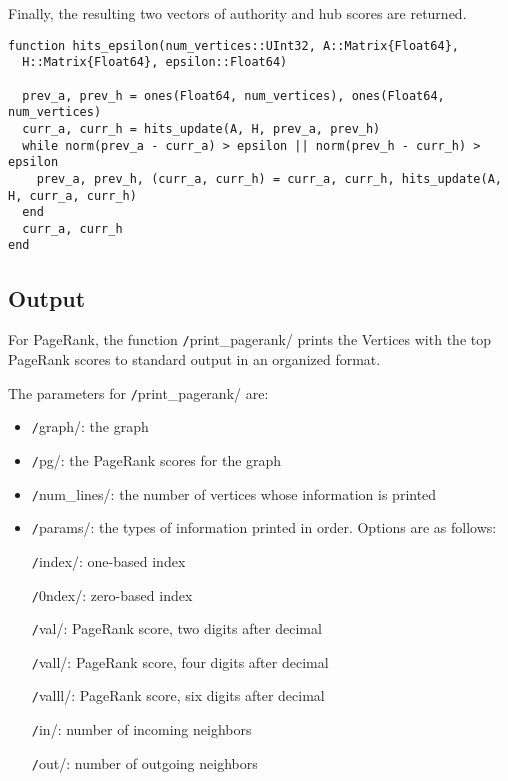 \documentclass[12pt, titlepage, twoside]{amsart}
\begin{document}
Finally, the resulting two vectors of authority and hub scores are returned.

\begin{verbatim}
function hits_epsilon(num_vertices::UInt32, A::Matrix{Float64},
  H::Matrix{Float64}, epsilon::Float64)

  prev_a, prev_h = ones(Float64, num_vertices), ones(Float64, num_vertices)
  curr_a, curr_h = hits_update(A, H, prev_a, prev_h)
  while norm(prev_a - curr_a) > epsilon || norm(prev_h - curr_h) > epsilon
    prev_a, prev_h, (curr_a, curr_h) = curr_a, curr_h, hits_update(A, H, curr_a, curr_h)
  end
  curr_a, curr_h
end
\end{verbatim}

\subsection{Output}

For PageRank, the function \texttt/print_pagerank/ prints
the Vertices with the top PageRank scores to standard output in an organized format.

The parameters for \texttt/print_pagerank/ are:

\begin{itemize}[label={}]
\item \texttt/graph/: the graph

\item \texttt/pg/: the PageRank scores for the graph

\item \texttt/num_lines/: the number of vertices whose information is printed

\item \texttt/params/: the types of information printed in order. Options are as follows:

\texttt/index/: one-based index

\texttt/0ndex/: zero-based index

\texttt/val/: PageRank score, two digits after decimal

\texttt/vall/: PageRank score, four digits after decimal

\texttt/valll/: PageRank score, six digits after decimal

\texttt/in/: number of incoming neighbors

\texttt/out/: number of outgoing neighbors

\end{itemize}
\end{document}
